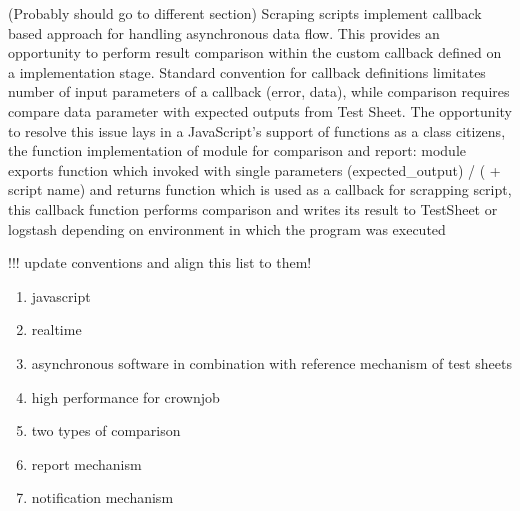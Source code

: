 (Probably should go to different section)
Scraping scripts implement callback based approach for handling asynchronous data flow. This provides an opportunity to perform result comparison within the custom callback defined on a implementation stage.
Standard convention for callback definitions limitates number of input parameters of a callback (error, data), while comparison requires compare data parameter with expected outputs from Test Sheet. The opportunity to resolve this issue lays in a JavaScript's support of functions as a class citizens, the function implementation of module for comparison and report: module exports function which invoked with single parameters (expected\_output) / ( + script name) and returns function which is used as a callback for scrapping script, this callback function performs comparison and writes its result to TestSheet or logstash depending on environment in which the program was executed


!!! update conventions and align this list to them!
\begin{enumerate}
	\item javascript
	\item realtime
	\item asynchronous software in combination with reference mechanism of test sheets
	\item high performance for crownjob
	\item two types of comparison
	\item report mechanism
	\item notification mechanism
	
\end{enumerate}